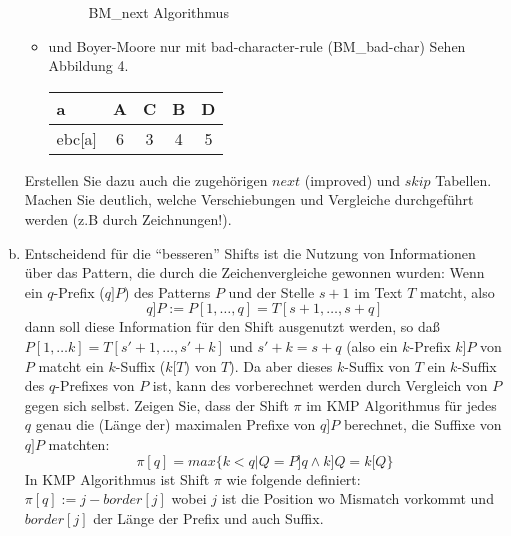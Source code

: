 \documentclass{article}
\begin{document}
\begin{flushleft}
\begin{enumerate}[(a)]
\begin{itemize}
\begin{figure}
        \caption{BM\_next Algorithmus} 
        \end{figure}
        \item und Boyer-Moore nur mit bad-character-rule (BM\_bad-char)
        \newline
        Sehen Abbildung 4.
        \newline \\
        \begin{tabular}{||l|c|c|c|c||}
            \hline a & A & C & B & D \\
            \hline ebc[a] & 6 & 3 & 4 & 5 \\
            \hline
        \end{tabular}
        \newline
    \end{itemize}
    Erstellen Sie dazu auch die zugehörigen $next$ (improved) und $skip$ Tabellen. Machen Sie deutlich,
    welche Verschiebungen und Vergleiche durchgeführt werden (z.B durch Zeichnungen!).
    \newpage
    \item Entscheidend für die ``besseren'' Shifts ist die Nutzung von Informationen über das Pattern, die
    durch die Zeichenvergleiche gewonnen wurden:
    \newline
    Wenn ein $q$-Prefix ($q] P$) des Patterns $P$ und der Stelle $s + 1$ im Text $T$ matcht, also
    \begin{equation*}
        q] P := P[ 1,\dots,q]  = T[ s + 1,\dots,s + q] 
    \end{equation*}
    dann soll diese Information für den Shift ausgenutzt werden, so daß $P[1,\dots k] = T[s' + 1,\dots,s' + k]$ und
    $s' + k = s + q$ (also ein $k$-Prefix $k]P$ von $P$ matcht ein $k$-Suffix ($k[T$) von $T$). Da aber dieses $k$-Suffix
    von $T$ ein $k$-Suffix des $q$-Prefixes von $P$ ist, kann des vorberechnet werden durch Vergleich von $P$ gegen sich
    selbst.
    \newline
    Zeigen Sie, dass der Shift $\pi$ im KMP Algorithmus für jedes $q$ genau die (Länge der) maximalen Prefixe von $q]P$
    berechnet, die Suffixe von $q]P$ matchten:
    \begin{equation*}
        \pi[q] = max\{k < q | Q = P]q \land k]Q = k[Q\}
    \end{equation*} 
    \newline
    In KMP Algorithmus ist Shift $\pi$ wie folgende definiert:
    \newline
    $\pi[q] := j - border[j]$ wobei $j$ ist die Position wo Mismatch vorkommt und $border[j]$ der Länge der Prefix und auch Suffix.

\end{enumerate}
\end{flushleft}
\end{document}
